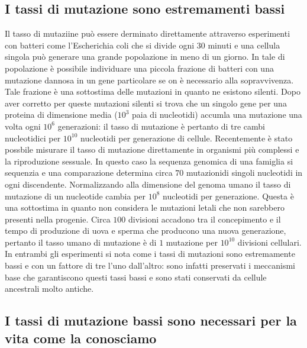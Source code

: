 \subsection{I tassi di mutazione sono estremamenti bassi}
Il tasso di mutaziine pu\`o essere derminato direttamente attraverso esperimenti con batteri come l'Escherichia coli che si divide ogni $30$ minuti e una cellula singola pu\`o generare
una grande popolazione in meno di un giorno. In tale di popolazione \`e possibile individuare una piccola frazione di batteri con una mutazione dannosa in un gene particolare se on
\`e necessario alla sopravvivenza. Tale frazione \`e una sottostima delle mutazioni in quanto ne esistono silenti. Dopo aver corretto per queste mutazioni silenti si trova che un singolo
gene per una proteina di dimensione media ($10^3$ paia di nucleotidi) accumla una mutazione una volta ogni $10^6$ generazioni: il tasso di mutazione \`e pertanto di tre cambi 
nucleotidici per $10^{10}$ nucleotidi per generazione di cellule. Recentemente \`e stato possbile misurare il tasso di mutazione direttamente in organismi pi\`u complessi e la 
riproduzione sessuale. In questo caso la sequenza genomica di una famiglia si sequenzia e una comparazione determina circa $70$ mutazionidi singoli nucleotidi in ogni discendente. 
Normalizzando alla dimensione del genoma umano il tasso di mutazione di un nucleotide cambia per $10^8$ nucleotidi per generazione. Questa \`e una sottostima in quanto non considera le 
mutazioni letali che non sarebbero presenti nella progenie. Circa $100$ divisioni accadono tra il concepimento e il tempo di produzione di uova e sperma che producono una nuova 
generazione, pertanto il tasso umano di mutazione \`e di $1$ mutazione per $10^{10}$ divisioni cellulari. In entrambi gli esperimenti si nota come i tassi di mutazioni sono estremamente
bassi e con un fattore di tre l'uno dall'altro: sono infatti preservati i meccanismi base che garantiscono questi tassi bassi e sono stati conservati da cellule ancestrali molto antiche.
\subsection{I tassi di mutazione bassi sono necessari per la vita come la conosciamo}

